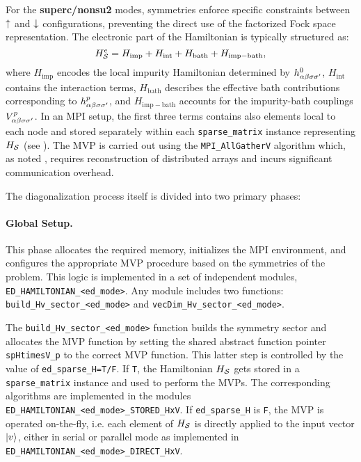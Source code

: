 \documentclass[edipack_sp.tex]{subfiles}
\begin{document}
For the {\bf superc/nonsu2} modes, symmetries enforce specific constraints between
$\uparrow$ and $\downarrow$ configurations, preventing the direct use of the
factorized Fock space representation. The electronic
part of the Hamiltonian is typically structured as:
\begin{equation}
H^e_{\cal S} = H_\mathrm{imp} + H_\mathrm{int} + H_\mathrm{bath} + H_\mathrm{imp-bath},
\end{equation}
where $H_\mathrm{imp}$ encodes the local impurity Hamiltonian
determined by $h^0_{\alpha\beta\sigma\sigma'}$,
$H_\mathrm{int}$ contains the interaction terms, $H_\mathrm{bath}$
describes the effective bath contributions corresponding to
$h^p_{\alpha\beta\sigma\sigma'}$, and $H_\mathrm{imp-bath}$ accounts for the
impurity-bath couplings $V^p_{\alpha\beta\sigma\sigma'}$.
In an MPI setup, the first three terms contains also elements local to each node and
stored separately within each {\tt sparse\_matrix} instance representing $H_{\cal S}$ (see ).
The MVP is carried out using the {\tt MPI\_AllGatherV} algorithm which, as noted  
, requires reconstruction of distributed
arrays and incurs significant communication overhead.
\vspace{2mm}


\noindent
The diagonalization process itself is divided into two primary phases:
\paragraph{\bf Global Setup.} This phase allocates the required memory, initializes
the MPI environment, and configures the appropriate MVP procedure
based on the symmetries of the problem. This logic is implemented in
a set of independent modules, {\tt ED\_HAMILTONIAN\_<ed\_mode>}. Any module includes two functions: {\tt build\_Hv\_sector\_<ed\_mode>} and  {\tt vecDim\-\_\-Hv\-\_\-sector\-\_\-<ed\_mode>}.

The {\tt build\_Hv\_sector\_<ed\_mode>} function builds the symmetry sector and
allocates the MVP function by setting the shared abstract function pointer {\tt
  spHtimesV\_p} to the correct MVP function. 
  This latter step is controlled by the value of
{\tt ed\_sparse\_H=T/F}. If {\tt T}, the Hamiltonian $H_{\cal S}$
gets stored in a {\tt sparse\_matrix} instance and used to perform
the MVPs. The corresponding algorithms are implemented in the modules {\tt
  ED\_HAMILTONIAN\-\_\-<ed\_mode>\-\_\-STORED\-\_HxV}.
If {\tt ed\_sparse\_H} is {\tt F}, the MVP is operated on-the-fly,
i.e. each element of $H_{\cal S}$ is directly applied to the input
vector $|v\rangle$, either in serial or parallel mode as implemented in {\tt
  ED\_HAMILTONIAN\_<ed\_mode>\_DIRECT\_HxV}.  
\end{document}
